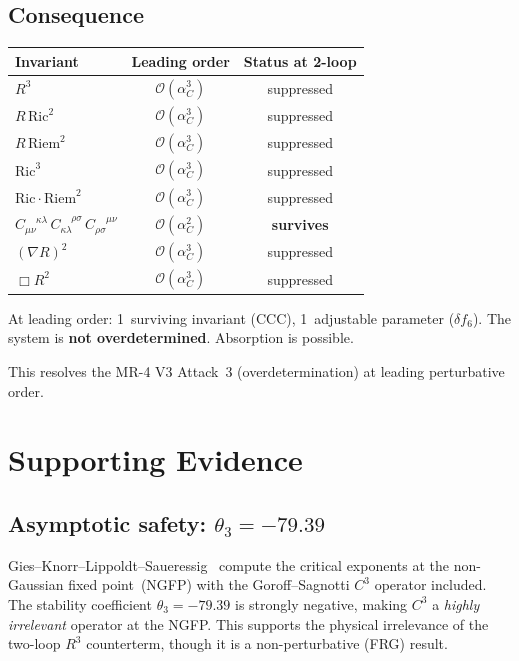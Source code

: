 \documentclass[11pt,a4paper]{article}
\newcommand{\order}{\mathcal{O}}
\newcommand{\CCC}{C_{\mu\nu}^{\;\;\;\;\kappa\lambda}\,
  C_{\kappa\lambda}^{\;\;\;\;\rho\sigma}\,
  C_{\rho\sigma}^{\;\;\;\;\mu\nu}}
\begin{document}
\subsection{Consequence}

\begin{center}
\begin{tabular}{l c c}
\toprule
Invariant & Leading order & Status at 2-loop \\
\midrule
$R^3$ & $\order(\alpha_C^3)$ & suppressed \\
$R\,\mathrm{Ric}^2$ & $\order(\alpha_C^3)$ & suppressed \\
$R\,\mathrm{Riem}^2$ & $\order(\alpha_C^3)$ & suppressed \\
$\mathrm{Ric}^3$ & $\order(\alpha_C^3)$ & suppressed \\
$\mathrm{Ric}\cdot\mathrm{Riem}^2$ & $\order(\alpha_C^3)$ & suppressed \\
$\CCC$ & $\order(\alpha_C^2)$ & \textbf{survives} \\
$(\nabla R)^2$ & $\order(\alpha_C^3)$ & suppressed \\
$\Box R^2$ & $\order(\alpha_C^3)$ & suppressed \\
\bottomrule
\end{tabular}
\end{center}

At leading order: 1~surviving invariant (CCC), 1~adjustable parameter
($\delta f_6$).  The system is \textbf{not overdetermined}.  Absorption is
possible.

This resolves the MR-4 V3 Attack~3 (overdetermination) at leading
perturbative order.


\section{Supporting Evidence}
\label{sec:support}

\subsection{Asymptotic safety: $\theta_3=-79.39$}

Gies--Knorr--Lippoldt--Saueressig~\cite{Gies:2016} compute the critical
exponents at the non-Gaussian fixed point~(NGFP) with the Goroff--Sagnotti
$C^3$ operator included.  The stability coefficient
$\theta_3=-79.39$ is strongly negative, making $C^3$ a
\emph{highly irrelevant} operator at the NGFP.  This supports the physical
irrelevance of the two-loop $R^3$ counterterm, though it is a
non-perturbative (FRG) result.
\end{document}
